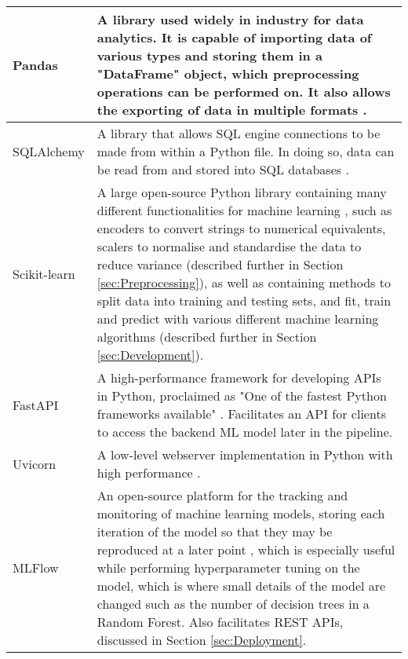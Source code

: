 \begin{longtable}{ |p{}| p{}|}
    \hline
    Pandas &
    A library used widely in industry for data analytics. It is capable of importing data of various 
    types and storing them in a "DataFrame" object, which preprocessing operations can be performed on.
    It also allows the exporting of data in multiple formats \autocite{pandas_pandas_nodate}.\\
    \hline
    SQLAlchemy &
    A library that allows SQL engine connections to be made from within a Python file. In 
    doing so, data can be read from and stored into SQL databases \autocite{sqlalchemy_sqlalchemy_nodate}.\\
    \hline
    Scikit-learn & 
    A large open-source Python library containing many different functionalities for machine learning \autocite{scikit-learn_scikit-learn_nodate}, 
    such as encoders to convert strings to numerical equivalents, scalers to normalise and standardise 
    the data to reduce variance (described further in Section \ref{sec:Preprocessing}), as well as containing 
    methods to split data into training and testing sets, and fit, train and predict with various different 
    machine learning algorithms (described further in Section \ref{sec:Development}).\\
    \hline
    FastAPI &
    A high-performance framework for developing APIs in Python, proclaimed
    as "One of the fastest Python frameworks available" \autocite{fastapi_fastapi_nodate}.
    Facilitates an API for clients to access the backend ML model later in the pipeline. \\
    \hline
    Uvicorn &
    A low-level webserver implementation in Python with high performance \autocite{uvicorn_uvicorn_nodate}.\\
    \hline
    MLFlow &
    An open-source platform for the tracking and monitoring of machine learning models, 
    storing each iteration of the model so that they may be reproduced at a later point \autocite{mlflow_mlflow_nodate},
    which is especially useful while performing hyperparameter tuning on the model, which is where 
    small details of the model are changed such as the number of decision trees in a Random Forest.
    Also facilitates REST APIs, discussed in Section \ref{sec:Deployment}.\\

\end{longtable}
